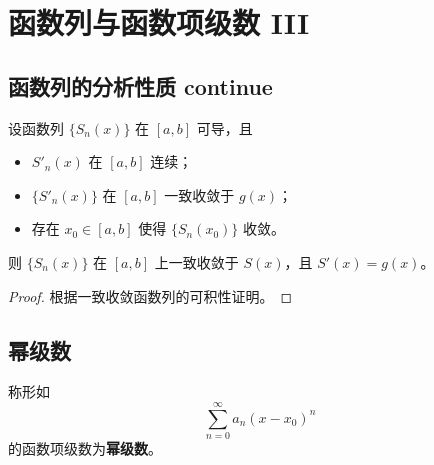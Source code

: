 \section{函数列与函数项级数 III}

\subsection{函数列的分析性质 continue}

\begin{theorem}
    设函数列 $\{S_n(x)\}$ 在 $[a, b]$ 可导，且
    \begin{itemize}
        \item $S'_n(x)$ 在 $[a, b]$ 连续；
        \item $\{S'_n(x)\}$ 在 $[a, b]$ 一致收敛于 $g(x)$；
        \item 存在 $x_0 \in [a, b]$ 使得 $\{S_n(x_0)\}$ 收敛。
    \end{itemize}
    则 $\{S_n(x)\}$ 在 $[a, b]$ 上一致收敛于 $S(x)$，且 $S'(x) = g(x)$。

    \begin{proof}
        根据一致收敛函数列的可积性证明。
    \end{proof}
\end{theorem}

\subsection{幂级数}

\begin{definition}[幂级数]
    称形如
    $$
    \sum_{n = 0}^{\infty} a_n (x - x_0)^{n}
    $$
    的函数项级数为\textbf{幂级数}。
\end{definition}

